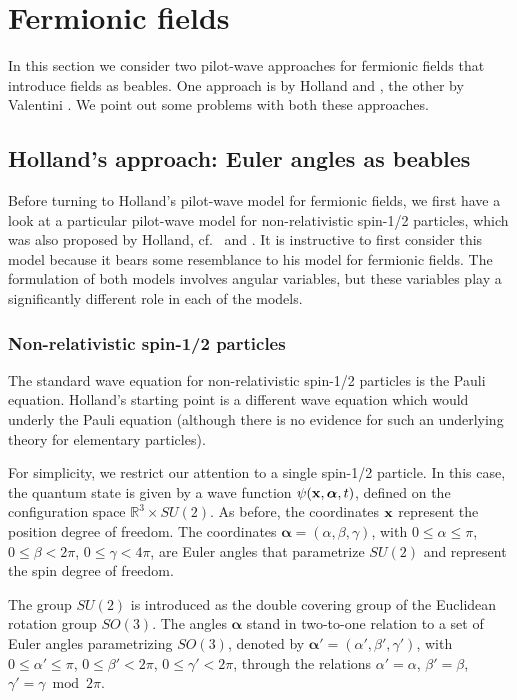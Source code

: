 \documentclass[12pt]{article}
\begin{document}
\section{Fermionic fields}\label{fermionicfields}
In this section we consider two pilot-wave approaches for fermionic fields that introduce fields as beables. One approach is by Holland \cite[pp.\ 449-457]{holland93b} and \cite{holland881}, the other by Valentini \cite{valentini92,valentini96}. We point out some problems with both these approaches. 


\subsection{Holland's approach: Euler angles as beables}
Before turning to Holland's pilot-wave model for fermionic fields, we first have a look at a particular pilot-wave model for non-relativistic spin-1/2 particles, which was also proposed by Holland, cf.\ \cite[pp.\ 424-448]{holland93b} and \cite{holland881,holland882}. It is instructive to first consider this model because it bears some resemblance to his model for fermionic fields. The formulation of both models involves angular variables, but these variables play a significantly different role in each of the models. 

\subsubsection{Non-relativistic spin-1/2 particles}
The standard wave equation for non-relativistic spin-1/2 particles is the Pauli equation. Holland's starting point is a different wave equation which would underly the Pauli equation (although there is no evidence for such an underlying theory for elementary particles). 

For simplicity, we restrict our attention to a single spin-1/2 particle. In this case, the quantum state is given by a wave function $\psi({\bf x},{\boldsymbol \alpha},t)$, defined on the configuration space ${\mathbb R}^3 \times SU(2)$. As before, the coordinates ${\bf x}$ represent the position degree of freedom. The coordinates ${\boldsymbol \alpha}=(\alpha,\beta,\gamma)$, with $0 \leqslant \alpha \leqslant \pi$, $0 \leqslant \beta < 2\pi$, $0 \leqslant \gamma < 4\pi$, are Euler angles that parametrize $SU(2)$ and represent the spin degree of freedom.    

The group $SU(2)$ is introduced as the double covering group of the Euclidean rotation group $SO(3)$. The angles ${\boldsymbol \alpha}$ stand in two-to-one relation to a set of Euler angles parametrizing $SO(3)$, denoted by ${\boldsymbol \alpha}'=(\alpha',\beta',\gamma')$, with $0 \leqslant \alpha' \leqslant \pi$, $0 \leqslant \beta' < 2\pi$, $0 \leqslant \gamma' < 2\pi$, through the relations $\alpha'=\alpha$, $\beta'=\beta$, $\gamma'=\gamma \bmod 2\pi$.
\end{document}
